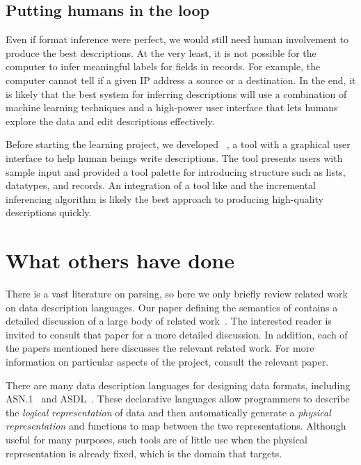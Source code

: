 \documentclass{sig-alternate}
\begin{document}
\subsection{Putting humans in the loop}
Even if format inference were perfect, we would still need human
involvement to produce the best descriptions.  At the very least, it
is not possible for the computer to infer meaningful labels for fields
in records.  For example, the computer cannot tell if a given IP
address a source or a destination.  In the end, it is likely that the
best system for inferring descriptions will use a combination of
machine learning techniques and a high-power user interface that lets
humans explore the data and edit descriptions effectively.

Before starting the learning project, we developed
\launchpads{}~\cite{planx06:launchpads}, a tool with a graphical user
interface to help human beings write descriptions.  The tool 
presents users with sample input and provided a tool palette for
introducing structure such as lists, datatypes, and records.  An
integration of a tool like \launchpads{} and the incremental
inferencing algorithm is likely the best approach to producing
high-quality descriptions quickly.
   

\section{What others have done}
\label{sec:related}
There is a vast literature on parsing, so here we only briefly review
related work on data description languages.  Our paper defining the
semantics of \pads{} contains a detailed discussion of a large body of
related work~\cite{Fisher+:ddca}.  The interested reader is invited to
consult that paper for a more detailed discussion.  In addition, each
of the \pads{} papers mentioned here discusses the relevant related
work.  For more information on particular aspects of the \pads{}
project, consult the relevant paper.

There are many data description languages for designing data formats,
including ASN.1~\cite{asn} and ASDL~\cite{ASDL}.  These declarative
languages allow programmers to describe the \textit{logical representation} of
data and then automatically generate a \textit{physical
  representation} and functions to map between the two representations.
Although useful for many purposes, such tools are of little use when
the physical representation is already fixed, which is the domain that
\pads{} targets.
\end{document}
